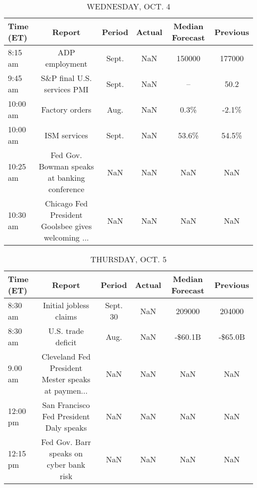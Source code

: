\documentclass{article}%
\begin{document}
%


\begin{table}[htbp]%
\caption{WEDNESDAY, OCT. 4}%
\centering%
\begin{adjustbox}{width=1\textwidth}%
\begin{tabular}{lccccc}
\toprule
Time (ET) &                                             Report & Period & Actual & Median Forecast & Previous \\
\midrule
  8:15 am &                                     ADP employment &  Sept. &    NaN &          150000 &   177000 \\
  9:45 am &                        S\&P final U.S. services PMI &  Sept. &    NaN &              -- &     50.2 \\
 10:00 am &                                     Factory orders &   Aug. &    NaN &            0.3\% &    -2.1\% \\
 10:00 am &                                       ISM services &  Sept. &    NaN &           53.6\% &    54.5\% \\
 10:25 am &       Fed Gov. Bowman speaks at banking conference &    NaN &    NaN &             NaN &      NaN \\
 10:30 am & Chicago Fed President Goolsbee gives welcoming ... &    NaN &    NaN &             NaN &      NaN \\
\bottomrule
\end{tabular}
%
\end{adjustbox}%
\end{table}

%


\begin{table}[htbp]%
\caption{THURSDAY, OCT. 5}%
\centering%
\begin{adjustbox}{width=1\textwidth}%
\begin{tabular}{lccccc}
\toprule
Time (ET) &                                             Report &   Period & Actual & Median Forecast & Previous \\
\midrule
  8:30 am &                             Initial jobless claims & Sept. 30 &    NaN &          209000 &   204000 \\
  8:30 am &                                 U.S. trade deficit &     Aug. &    NaN &         -\$60.1B &  -\$65.0B \\
  9.00 am & Cleveland Fed President Mester speaks at paymen... &      NaN &    NaN &             NaN &      NaN \\
 12:00 pm &            San Francisco Fed President Daly speaks &      NaN &    NaN &             NaN &      NaN \\
 12:15 pm &            Fed Gov. Barr speaks on cyber bank risk &      NaN &    NaN &             NaN &      NaN \\
\bottomrule
\end{tabular}
%
\end{adjustbox}%
\end{table}
\end{document}
